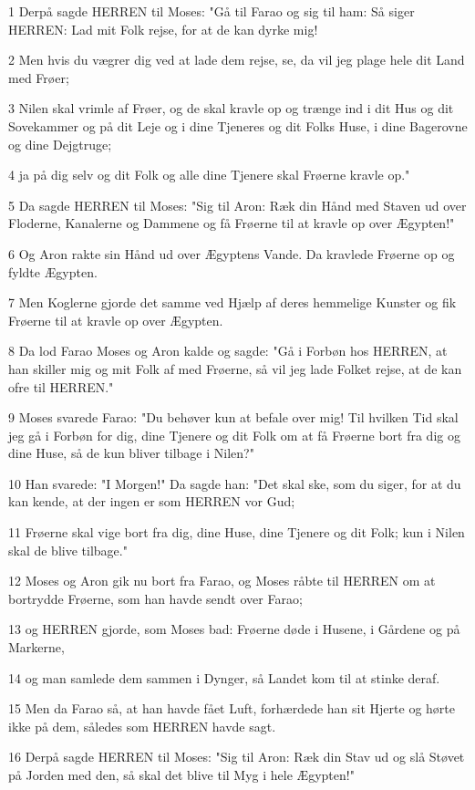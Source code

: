 \par 1 Derpå sagde HERREN til Moses: "Gå til Farao og sig til ham: Så siger HERREN: Lad mit Folk rejse, for at de kan dyrke mig!
\par 2 Men hvis du vægrer dig ved at lade dem rejse, se, da vil jeg plage hele dit Land med Frøer;
\par 3 Nilen skal vrimle af Frøer, og de skal kravle op og trænge ind i dit Hus og dit Sovekammer og på dit Leje og i dine Tjeneres og dit Folks Huse, i dine Bagerovne og dine Dejgtruge;
\par 4 ja på dig selv og dit Folk og alle dine Tjenere skal Frøerne kravle op."
\par 5 Da sagde HERREN til Moses: "Sig til Aron: Ræk din Hånd med Staven ud over Floderne, Kanalerne og Dammene og få Frøerne til at kravle op over Ægypten!"
\par 6 Og Aron rakte sin Hånd ud over Ægyptens Vande. Da kravlede Frøerne op og fyldte Ægypten.
\par 7 Men Koglerne gjorde det samme ved Hjælp af deres hemmelige Kunster og fik Frøerne til at kravle op over Ægypten.
\par 8 Da lod Farao Moses og Aron kalde og sagde: "Gå i Forbøn hos HERREN, at han skiller mig og mit Folk af med Frøerne, så vil jeg lade Folket rejse, at de kan ofre til HERREN."
\par 9 Moses svarede Farao: "Du behøver kun at befale over mig! Til hvilken Tid skal jeg gå i Forbøn for dig, dine Tjenere og dit Folk om at få Frøerne bort fra dig og dine Huse, så de kun bliver tilbage i Nilen?"
\par 10 Han svarede: "I Morgen!" Da sagde han: "Det skal ske, som du siger, for at du kan kende, at der ingen er som HERREN vor Gud;
\par 11 Frøerne skal vige bort fra dig, dine Huse, dine Tjenere og dit Folk; kun i Nilen skal de blive tilbage."
\par 12 Moses og Aron gik nu bort fra Farao, og Moses råbte til HERREN om at bortrydde Frøerne, som han havde sendt over Farao;
\par 13 og HERREN gjorde, som Moses bad: Frøerne døde i Husene, i Gårdene og på Markerne,
\par 14 og man samlede dem sammen i Dynger, så Landet kom til at stinke deraf.
\par 15 Men da Farao så, at han havde fået Luft, forhærdede han sit Hjerte og hørte ikke på dem, således som HERREN havde sagt.
\par 16 Derpå sagde HERREN til Moses: "Sig til Aron: Ræk din Stav ud og slå Støvet på Jorden med den, så skal det blive til Myg i hele Ægypten!"
